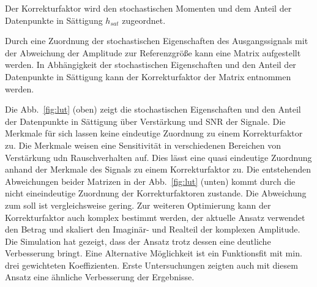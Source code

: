 Der Korrekturfaktor wird den stochastischen Momenten und dem Anteil der Datenpunkte in Sättigung $h_{sat}$ zugeordnet.

Durch eine Zuordnung der stochastischen Eigenschaften des Ausgangssignals mit der Abweichung der Amplitude zur Referenzgröße kann eine Matrix aufgestellt werden. In Abhängigkeit der stochastischen Eigenschaften und den Anteil der Datenpunkte in Sättigung kann der Korrekturfaktor der Matrix entnommen werden. 


Die Abb.~\ref{fig:lut} (oben) zeigt die stochastischen Eigenschaften und den Anteil der Datenpunkte in Sättigung über Verstärkung und SNR der Signale. Die Merkmale für sich lassen keine eindeutige Zuordnung zu einem Korrekturfaktor zu. Die Merkmale weisen eine Sensitivität in verschiedenen Bereichen von Verstärkung udn Rauschverhalten auf. Dies lässt eine quasi eindeutige Zuordnung anhand der Merkmale des Signals zu einem Korrekturfaktor zu. Die entstehenden Abweichungen beider Matrizen in der Abb.~\ref{fig:lut} (unten) kommt durch die nicht eineindeutige Zuordnung der Korrekturfaktoren zustande. Die Abweichung zum soll ist vergleichsweise gering. Zur weiteren Optimierung kann der Korrekturfaktor auch komplex bestimmt werden, der aktuelle Ansatz verwendet den Betrag und skaliert den Imaginär- und Realteil der komplexen Amplitude. Die Simulation hat gezeigt, dass der Ansatz trotz dessen eine deutliche Verbesserung bringt. Eine Alternative Möglichkeit ist ein Funktionsfit mit min. drei gewichteten Koeffizienten. Erste Untersuchungen zeigten auch mit diesem Ansatz eine ähnliche Verbesserung der Ergebnisse.

